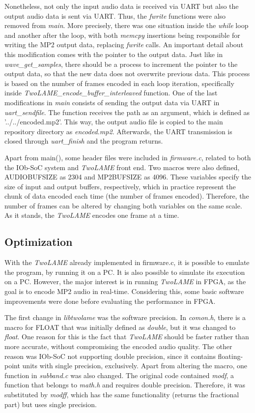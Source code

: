 Nonetheless, not only the input audio data is received via UART but also the output audio data is sent via UART. Thus, the \textit{fwrite} functions were also removed from \textit{main}.
More precisely, there was one situation inside the \textit{while} loop and another after the loop, with both \textit{memcpy} insertions being responsible for writing the MP2 output data, replacing \textit{fwrite} calls. An important detail about this modification comes with the pointer to the output data. Just like in \textit{wave\_get\_samples}, there should be a process to increment the pointer to the output data, so that the new data does not overwrite previous data. This process is based on the number of frames encoded in each loop iteration, specifically inside \textit{\textit{TwoLAME}\_encode\_buffer\_interleaved} function.
One of the last modifications in \textit{main} consists of sending the output data via UART in \textit{uart\_sendfile}. The function receives the path as an argument, which is defined as ’../../encoded.mp2’. This way, the output audio file is copied to the main repository directory as \textit{encoded.mp2}.
Afterwards, the UART transmission is closed through \textit{uart\_finish} and the program returns.

Apart from main(), some header files were included in \textit{firmware.c}, related to both the IOb-SoC system and \textit{TwoLAME} front end. Two macros were also defined, AUDIOBUFSIZE as 2304 and MP2BUFSIZE as 4096. These variables specify the size of input and output buffers, respectively, which in practice represent the chunk of data encoded each time (the number of frames encoded). Therefore, the number of frames can be altered by changing both variables on the same scale. As it stands, the \textit{TwoLAME} encodes one frame at a time.


\subsection{Optimization}

With the \textit{TwoLAME} already implemented in firmware.c, it is possible to emulate the program, by running it on a PC. It is also possible to simulate its execution on a PC. However, the major interest is in running \textit{TwoLAME} in FPGA, as the goal is to encode MP2 audio in real-time. Considering this, some basic software improvements were done before evaluating the performance in FPGA.

The first change in \textit{libtwolame} was the software precision. In \textit{comon.h}, there is a macro for FLOAT that was initially defined as \textit{double}, but it was changed to \textit{float}. One reason for this is the fact that \textit{TwoLAME} should be faster rather than more accurate, without compromising the encoded audio quality. The other reason was IOb-SoC not supporting double precision, since it contains floating-point units with single precision, exclusively. Apart from altering the macro, one function in \textit{subband.c} was also changed. The original code contained \textit{modf}, a function that belongs to \textit{math.h} and requires double precision. Therefore, it was substituted by \textit{modff}, which has the same functionality (returns the fractional part) but uses single precision.

